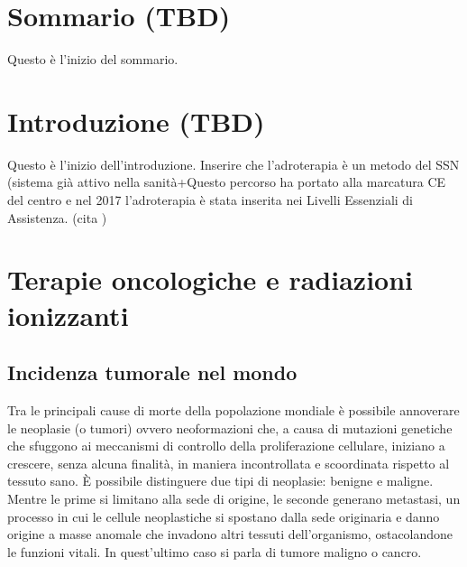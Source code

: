 \documentclass[12pt,a4paper,twoside]{report}
\begin{document}
	\chapter*{Sommario (TBD)}
		Questo è l'inizio del sommario.
	\newpage
	\tableofcontents
	\newpage
	\chapter*{Introduzione (TBD)}
		Questo è l'inizio dell'introduzione. Inserire che l'adroterapia è un metodo del SSN (sistema già attivo nella sanità+Questo percorso ha portato alla marcatura CE del centro e nel 2017 l'adroterapia è stata inserita nei Livelli Essenziali di Assistenza.
		(cita
		)
	\newpage
	
	
	\chapter{Terapie oncologiche e radiazioni ionizzanti}
	\section{Incidenza tumorale nel mondo}\label{sec:1.1}
	Tra le principali cause di morte della popolazione mondiale è possibile annoverare le neoplasie (o tumori) ovvero neoformazioni che, a causa di mutazioni genetiche che sfuggono ai meccanismi di controllo della proliferazione cellulare, iniziano a crescere, senza alcuna finalità, in maniera incontrollata e scoordinata rispetto al tessuto sano. \`E possibile distinguere due tipi di neoplasie: benigne e maligne. Mentre le prime si limitano alla sede di origine, le seconde generano metastasi, un processo in cui le cellule neoplastiche si spostano dalla sede originaria e danno origine a masse anomale che invadono altri tessuti dell'organismo, ostacolandone le funzioni vitali. In quest'ultimo caso si parla di tumore maligno o cancro.
	
\end{document}

